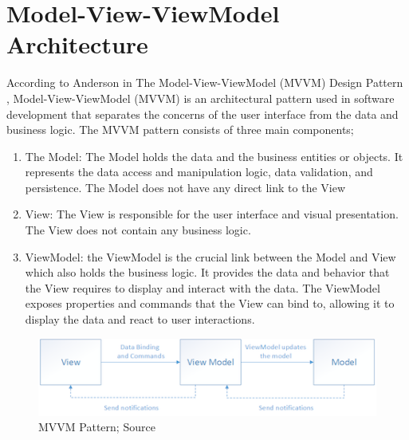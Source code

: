 \section{Model-View-ViewModel Architecture}
According to Anderson in The Model-View-ViewModel (MVVM) Design Pattern \autocite{anderson2012mvvm}, Model-View-ViewModel (MVVM) is an architectural pattern used in software development that separates the concerns of the user interface from the data and business logic. 
The MVVM pattern consists of three main components; 
\begin{enumerate}
    \item The Model:\newline
    The Model holds the data and the business entities or objects. It represents the data access and manipulation logic, data validation, and persistence. The Model does not have any direct link to the View
    \item View: \newline
    The View is responsible for the user interface and visual presentation. The View does not contain any business logic.
    \item ViewModel: \newline
    the ViewModel is the crucial link between the Model and View which also holds the business logic. It provides the data and behavior that the View requires to display and interact with the data. The ViewModel exposes properties and commands that the View can bind to, allowing it to display the data and react to user interactions. 
\end{enumerate}

\begin{figure}[H]
    \centering
    \includegraphics{images/mvvm-pattern.png}
    \caption{MVVM Pattern; Source \autocite{stonis2022mvvm}}
\end{figure}
